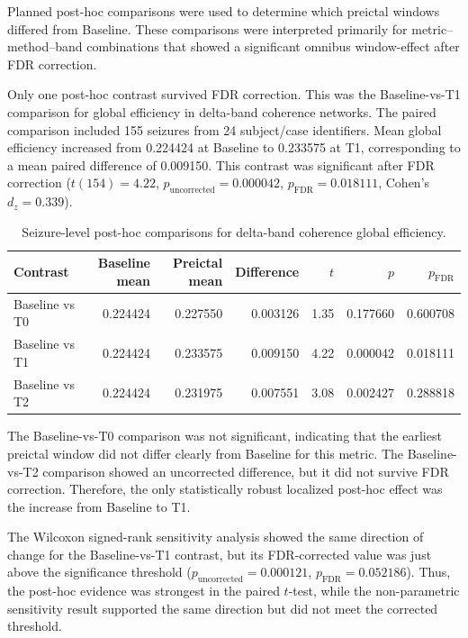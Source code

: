 Planned post-hoc comparisons were used to determine which preictal windows
differed from Baseline. These comparisons were interpreted primarily for
metric--method--band combinations that showed a significant omnibus
window-effect after FDR correction.

Only one post-hoc contrast survived FDR correction. This was the
Baseline-vs-T1 comparison for global efficiency in delta-band coherence
networks. The paired comparison included \num{155} seizures from \num{24}
subject/case identifiers. Mean global efficiency increased from
\num{0.224424} at Baseline to \num{0.233575} at T1, corresponding to a mean
paired difference of \num{0.009150}. This contrast was significant after FDR
correction ($t(154) = 4.22$, $p_{\mathrm{uncorrected}} = 0.000042$,
$p_{\mathrm{FDR}} = 0.018111$, Cohen's $d_z = 0.339$).

\begin{table}[H]
    \centering
    \begin{tabular}{lrrrrrr}
        \toprule
        Contrast & Baseline mean & Preictal mean & Difference
        & $t$ & $p$ & $p_{\mathrm{FDR}}$ \\
        \midrule
        Baseline vs T0
        & 0.224424 & 0.227550 & 0.003126
        & 1.35 & 0.177660 & 0.600708 \\

        Baseline vs T1
        & 0.224424 & 0.233575 & 0.009150
        & 4.22 & 0.000042 & 0.018111 \\

        Baseline vs T2
        & 0.224424 & 0.231975 & 0.007551
        & 3.08 & 0.002427 & 0.288818 \\
        \bottomrule
    \end{tabular}
    \caption{Seizure-level post-hoc comparisons for delta-band coherence
    global efficiency.}
    \label{tab:posthoc-global-efficiency-delta-coherence}
\end{table}

The Baseline-vs-T0 comparison was not significant, indicating that the earliest
preictal window did not differ clearly from Baseline for this metric. The
Baseline-vs-T2 comparison showed an uncorrected difference, but it did not
survive FDR correction. Therefore, the only statistically robust localized
post-hoc effect was the increase from Baseline to T1.

The Wilcoxon signed-rank sensitivity analysis showed the same direction of
change for the Baseline-vs-T1 contrast, but its FDR-corrected value was just
above the significance threshold
($p_{\mathrm{uncorrected}} = 0.000121$,
$p_{\mathrm{FDR}} = 0.052186$). Thus, the post-hoc evidence was strongest in
the paired $t$-test, while the non-parametric sensitivity result supported the
same direction but did not meet the corrected threshold.

